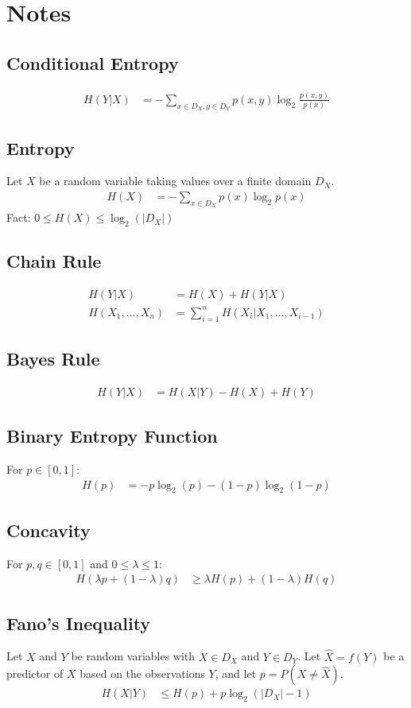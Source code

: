 \section*{Notes}

\subsection*{Conditional Entropy}
\begin{align*}
H(Y|X) &= -\sum_{x \in D_X, y \in D_Y} p(x,y) \log_2 \frac{p(x,y)}{p(x)}
\end{align*}

\subsection*{Entropy}
Let $X$ be a random variable taking values over a finite domain $D_X$.
\begin{align*}
H(X) &= -\sum_{x \in D_X} p(x) \log_2 p(x)
\end{align*}
Fact: $0 \leq H(X) \leq \log_2(|D_X|)$

\subsection*{Chain Rule}
\begin{align*}
H(Y|X) &= H(X) + H(Y|X) \\
H(X_1, \ldots, X_n) &= \sum_{i=1}^{n} H(X_i | X_1, \ldots, X_{i-1})
\end{align*}

\subsection*{Bayes Rule}
\begin{align*}
H(Y|X) &= H(X|Y) - H(X) + H(Y)
\end{align*}

\subsection*{Binary Entropy Function}
For $p \in [0,1]$:
\begin{align*}
H(p) &= -p\log_2(p) - (1-p)\log_2(1-p)
\end{align*}

\subsection*{Concavity}
For $p, q \in [0,1]$ and $0 \leq \lambda \leq 1$:
\begin{align*}
H(\lambda p + (1-\lambda)q) &\geq \lambda H(p) + (1-\lambda)H(q)
\end{align*}

\subsection*{Fano's Inequality}
Let $X$ and $Y$ be random variables with $X \in D_X$ and $Y \in D_Y$. Let $\hat{X} = f(Y)$ 
be a predictor of $X$ based on the observations $Y$, and let $p = P(X \neq \hat{X})$.
\begin{align*}
H(X|Y) &\leq H(p) + p \log_2(|D_X|-1)
\end{align*}
